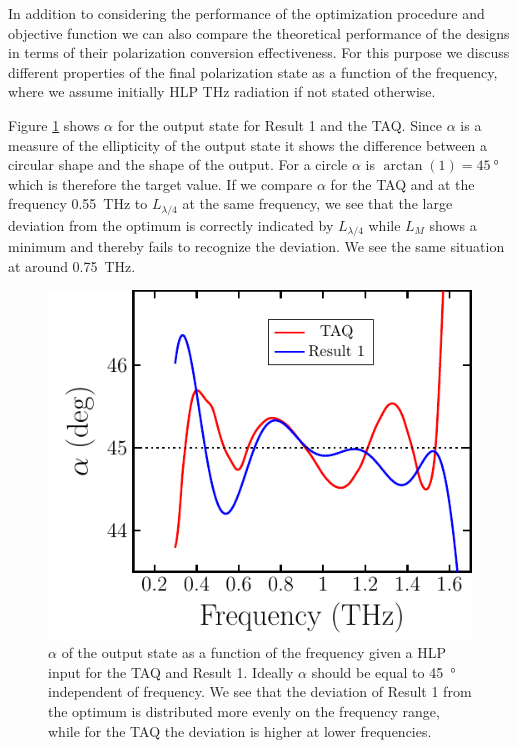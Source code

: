 In addition to considering the performance of the optimization procedure and objective function we can also compare the theoretical performance of the designs in terms of their polarization conversion effectiveness. For this purpose we discuss different properties of the final polarization state as a function of the frequency, where we assume initially HLP THz radiation if not stated otherwise.

Figure \ref{fig:cl4_alpha} shows $\alpha$ for the output state for Result 1 and the TAQ. Since $\alpha$ is a measure of the ellipticity of the output state it shows the difference between a circular shape and the shape of the output. For a circle $\alpha$ is $\arctan(1)=\SI{45}{\degree}$ which is therefore the target value. If we compare $\alpha$ for the TAQ and at the frequency \SI{0.55}{\tera \hertz} to $L_{\lambda/4}$ at the same frequency, we see that the large deviation from the optimum is correctly indicated by $L_{\lambda/4}$ while $L_M$ shows a minimum and thereby fails to recognize the deviation. We see the same situation at around \SI{0.75}{\tera \hertz}. 

\begin{figure}[H]
    \centering
    \includegraphics[scale=0.73]{images/results/plots/ceramic/alpha.pdf}
    \caption{$\alpha$ of the output state as a function of the frequency given a HLP input for the TAQ and Result 1. Ideally $\alpha$ should be equal to \SI{45}{\degree} independent of frequency. We see that the deviation of Result 1 from the optimum is distributed more evenly on the frequency range, while for the TAQ the deviation is higher at lower frequencies.}
    \label{fig:cl4_alpha}
\end{figure}

